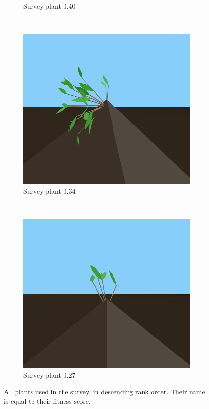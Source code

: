 \begin{figure}
\begin{subfigure}{0.48\textwidth}
        \caption{Survey plant 0.40}
    \end{subfigure}
    \\
    \begin{subfigure}{0.48\textwidth}
        \includegraphics[width=\textwidth]{figures/plant-34}
        \caption{Survey plant 0.34}
    \end{subfigure}
    ~
    \begin{subfigure}{0.48\textwidth}
        \includegraphics[width=\textwidth]{figures/plant-27}
        \caption{Survey plant 0.27}
    \end{subfigure}
    \ContinuedFloat
    \caption[All plants used in the survey]{All plants used in the survey, in descending rank order. Their name is equal to their fitness score.}
\end{figure}
